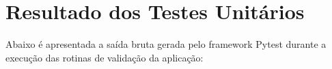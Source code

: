 \documentclass{article}
\begin{document}
\section*{Resultado dos Testes Unitários}

Abaixo é apresentada a saída bruta gerada pelo framework Pytest durante a execução das rotinas de validação da aplicação:


\end{document}
